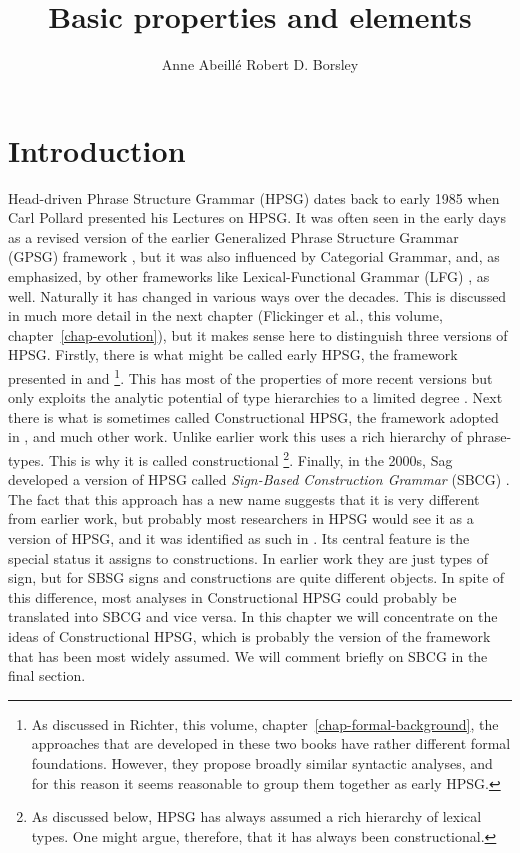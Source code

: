 \documentclass[output=paper
	        ,collection
	        ,collectionchapter
 	        ,biblatex
                ,babelshorthands
                ,newtxmath
                ,draftmode
                ,colorlinks, citecolor=brown
]{langscibook}
\title{Basic properties and elements}
\author{%
 Anne Abeillé\affiliation{Université Paris Diderot}%
 \lastand Robert D. Borsley\affiliation{University of Essex}%
}
\begin{document}
\maketitle
\label{chapter-basic-properties}\label{chap-properties}



\section{Introduction} 
Head-driven Phrase Structure Grammar (HPSG) dates back to early 1985 when Carl Pollard presented his Lectures on HPSG. It was often seen in the early days as a revised version of the earlier Generalized Phrase Structure Grammar (GPSG) framework \citep{GKPS85a}, but it was also influenced by Categorial Grammar, and, as \citet[1]{ps} emphasized, by other frameworks like Lexical-Functional Grammar (LFG) \citep{Bresnan82a-ed}, as well. Naturally it has changed in various ways over the decades. This is discussed in much more detail in the next chapter (Flickinger et al., this volume, chapter~\ref{chap-evolution}), but it makes sense here to distinguish three versions of HPSG. Firstly, there is what might be called early HPSG, the framework presented in \citet{ps} and \citet{ps2}%
%
\footnote{As discussed in Richter, this volume, chapter~\ref{chap-formal-background}, the approaches that are developed in these two books have rather different formal foundations. However, they propose broadly similar syntactic analyses, and for this reason it seems reasonable to group them together as early HPSG.}.
%
This has most of the properties of more recent versions but only exploits the analytic potential of type hierarchies to a limited degree \citep{Flickinger87,FPW85a}. Next there is what is sometimes called Constructional HPSG, the framework adopted in \citet{Sag97a,GSag2000a-u}, and much other work. Unlike earlier work this uses a rich hierarchy of phrase-types. This is why it is called constructional%
%
\footnote{As discussed below, HPSG has always assumed a rich hierarchy of lexical types. One might argue, therefore, that it has always been constructional.}.
%
Finally, in the 2000s, Sag developed a version of HPSG called \emph{Sign-Based Construction Grammar} (SBCG) \citep{Sag2012a}. The fact that this approach has a new name suggests that it is very different from earlier work, but probably most researchers in HPSG would see it as a version of HPSG, and it was identified as such in \citet[486]{Sag2010b}. Its central feature is the special status it assigns to constructions. In earlier work they are just types of sign, but for SBSG signs and constructions are quite different objects. In spite of this difference, most analyses in Constructional HPSG could probably be translated into SBCG and vice versa. In this chapter we will concentrate on the ideas of Constructional HPSG, which is probably the version of the framework that has been most widely assumed. We will comment briefly on SBCG in the final section.
\end{document}
